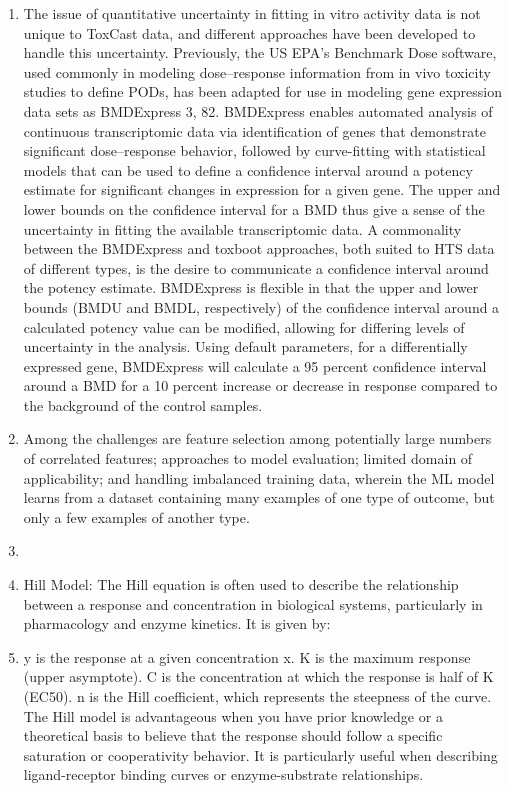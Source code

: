 \begin{enumerate}
    \item The issue of quantitative uncertainty in fitting in vitro activity data is not unique to ToxCast data, and different approaches have been developed to handle this uncertainty. Previously, the US EPA's Benchmark Dose software, used commonly in modeling dose–response information from in vivo toxicity studies to define PODs, has been adapted for use in modeling gene expression data sets as BMDExpress 3, 82. BMDExpress enables automated analysis of continuous transcriptomic data via identification of genes that demonstrate significant dose–response behavior, followed by curve-fitting with statistical models that can be used to define a confidence interval around a potency estimate for significant changes in expression for a given gene. The upper and lower bounds on the confidence interval for a BMD thus give a sense of the uncertainty in fitting the available transcriptomic data. A commonality between the BMDExpress and toxboot approaches, both suited to HTS data of different types, is the desire to communicate a confidence interval around the potency estimate. BMDExpress is flexible in that the upper and lower bounds (BMDU and BMDL, respectively) of the confidence interval around a calculated potency value can be modified, allowing for differing levels of uncertainty in the analysis. Using default parameters, for a differentially expressed gene, BMDExpress will calculate a 95 percent confidence interval around a BMD for a 10 percent increase or decrease in response compared to the background of the control samples.
    \item Among the challenges are feature selection among potentially large numbers of correlated features; approaches to model evaluation; limited domain of applicability; and handling imbalanced training data, wherein the ML model learns from a dataset containing many examples of one type of outcome, but only a few examples of another type.
    \item 
    \item Hill Model:
    The Hill equation is often used to describe the relationship between a response and concentration in biological systems, particularly in pharmacology and enzyme kinetics. It is given by:
    \item y is the response at a given concentration x.
    K is the maximum response (upper asymptote).
    C is the concentration at which the response is half of 
    K (EC50).
    n is the Hill coefficient, which represents the steepness of the curve.
    The Hill model is advantageous when you have prior knowledge or a theoretical basis to believe that the response should follow a specific saturation or cooperativity behavior. It is particularly useful when describing ligand-receptor binding curves or enzyme-substrate relationships.

\end{enumerate}
